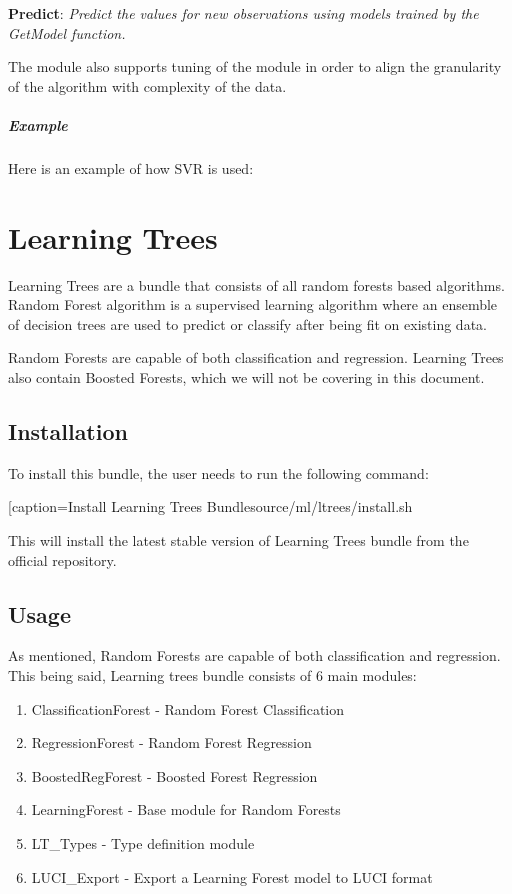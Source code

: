 \textbf{Predict}: \textit{Predict the values for new observations using models trained by the GetModel function.}

The module also supports tuning of the module in order to align the granularity of the algorithm with complexity of the data.

\paragraph{Example}

Here is an example of how SVR is used:



\chapter{Learning Trees}\label{supe:learntrees}

Learning Trees are a bundle that consists of all random forests based algorithms. Random Forest algorithm is a supervised learning algorithm where an ensemble of decision trees are used to predict or classify after being fit on existing data.

Random Forests are capable of both classification and regression. Learning Trees also contain Boosted Forests, which we will not be covering in this document.

\section{Installation}

To install this bundle, the user needs to run the following command:

[caption=Install Learning Trees Bundle{source/ml/ltrees/install.sh}

This will install the latest stable version of Learning Trees bundle from the official repository.

\section{Usage}

As mentioned, Random Forests are capable of both classification and regression. This being said, Learning trees bundle consists of 6 main modules:

\begin{enumerate}
    \item ClassificationForest - Random Forest Classification
    \item RegressionForest - Random Forest Regression
    \item BoostedRegForest - Boosted Forest Regression
    \item LearningForest - Base module for Random Forests
    \item LT\_Types - Type definition module
    \item LUCI\_Export - Export a Learning Forest model to LUCI format
\end{enumerate}

